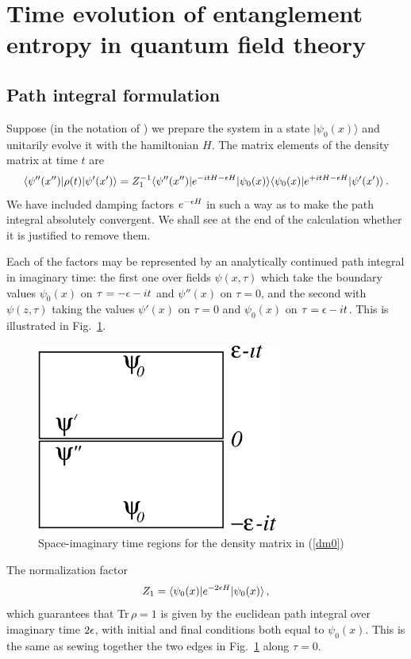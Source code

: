 \section{Time evolution of entanglement entropy in quantum field theory}
\label{cftsec}

\subsection{Path integral formulation}

Suppose (in the notation of \cite{cc-04}) we prepare the system in
a state $|\psi_0(x)\rangle$ and unitarily evolve it with the
hamiltonian $H$. The matrix elements of the density matrix at time
$t$ are
\begin{equation}
\langle\psi''(x'')|\rho(t)|\psi'(x')\rangle=Z_1^{-1}
\langle\psi''(x'')|e^{-itH-\epsilon H}|\psi_0(x)\rangle
\langle\psi_0(x)|e^{+itH-\epsilon H}|\psi'(x')\rangle\,. \label{dm0}
\end{equation}
We have included damping factors $e^{-\epsilon H}$
in such a way as to make the path
integral absolutely convergent. We shall see at the end of the
calculation whether it is justified to remove them.

Each of the factors may be represented by an analytically
continued path integral in imaginary time: the first one over
fields $\psi(x,\tau)$ which take the boundary values $\psi_0(x)$
on $\tau=-\epsilon-it$  and $\psi''(x)$ on $\tau=0$, and the second with
$\psi(z,\tau)$ taking the values $\psi'(x)$ on $\tau=0$ and
$\psi_0(x)$ on $\tau=\epsilon-it$. This is illustrated in
Fig.~\ref{figpi}.
\begin{figure}[ht]
\centering
\includegraphics[width=8cm]{pi.eps}
\caption{Space-imaginary time regions for the density matrix in (\ref{dm0})}
\label{figpi}
\end{figure}


The normalization factor
\begin{equation}
Z_1=\langle\psi_0(x)|e^{-2\epsilon H}|\psi_0(x)\rangle\,,
\end{equation}
which guarantees that Tr\,$\rho=1$ is given by the euclidean path
integral over imaginary time $2\epsilon$, with initial and final
conditions both equal to $\psi_0(x)$. This is the same as sewing
together the two edges in Fig.~\ref{figpi} along $\tau=0$.

